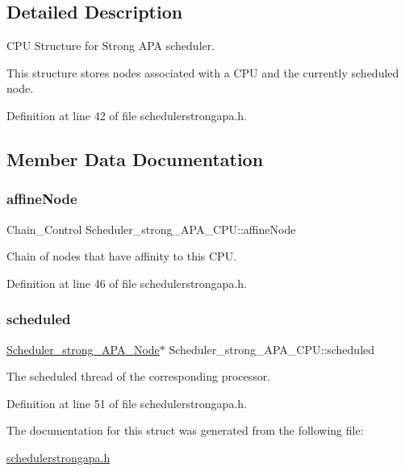 \subsection{Detailed Description}
C\+PU Structure for Strong A\+PA scheduler. 

This structure stores nodes associated with a C\+PU and the currently scheduled node. 

Definition at line 42 of file schedulerstrongapa.\+h.



\subsection{Member Data Documentation}
\mbox{\label{structScheduler__strong__APA__CPU_adf4eebd8db4f5b52fdfe7b352c8bddc7}} 
\subsubsection{\texorpdfstring{affine\+Node}{affineNode}}
{\footnotesize\ttfamily Chain\+\_\+\+Control Scheduler\+\_\+strong\+\_\+\+A\+P\+A\+\_\+\+C\+P\+U\+::affine\+Node}



Chain of nodes that have affinity to this C\+PU. 



Definition at line 46 of file schedulerstrongapa.\+h.

\mbox{\label{structScheduler__strong__APA__CPU_aa2f3c81477c08ef4188e5e24f054dffb}} 
\subsubsection{\texorpdfstring{scheduled}{scheduled}}
{\footnotesize\ttfamily \hyperlink{structScheduler__strong__APA__Node}{Scheduler\+\_\+strong\+\_\+\+A\+P\+A\+\_\+\+Node}$\ast$ Scheduler\+\_\+strong\+\_\+\+A\+P\+A\+\_\+\+C\+P\+U\+::scheduled}



The scheduled thread of the corresponding processor. 



Definition at line 51 of file schedulerstrongapa.\+h.



The documentation for this struct was generated from the following file\+:\begin{DoxyCompactItemize}
\item 
\hyperlink{schedulerstrongapa_8h}{schedulerstrongapa.\+h}\end{DoxyCompactItemize}

